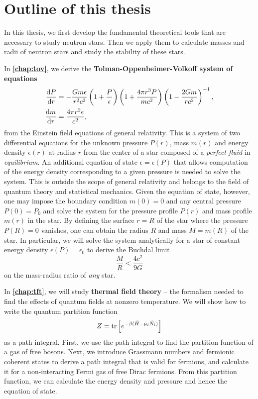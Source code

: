 \section{Outline of this thesis}

In this thesis, we first develop the fundamental theoretical tools that are necessary to study neutron stars.
Then we apply them to calculate masses and radii of neutron stars and study the stability of these stars.

In \textbf{\cref{chap:tov}}, we derive the \textbf{Tolman-Oppenheimer-Volkoff system of equations}
\begin{align*}
	\odv{P}{r} &= -\frac{G m \epsilon}{r^2 c^2} \left( 1 + \frac{P}{\epsilon} \right) \left( 1 + \frac{4 \pi r^3 P}{m c^2} \right) \left( 1 - \frac{2 G m}{r c^2} \right)^{-1} , \\
	\odv{m}{r} &= \frac{4 \pi r^2 \epsilon}{c^2} ,
\end{align*}
from the Einstein field equations of general relativity.
This is a system of two differential equations for the unknown pressure $P(r)$, mass $m(r)$ and energy density $\epsilon(r)$ at radius $r$ from the center of a star composed of a \emph{perfect fluid} in \emph{equilibrium}.
An additional equation of state $\epsilon = \epsilon(P)$ that allows computation of the energy density corresponding to a given pressure is needed to solve the system.
This is outside the scope of general relativity and belongs to the field of quantum theory and statistical mechanics.
Given the equation of state, however, one may impose the boundary condition $m(0) = 0$ and any central pressure $P(0) = P_0$ and solve the system for the pressure profile $P(r)$ and mass profile $m(r)$ in the star.
By defining the surface $r=R$ of the star where the pressure $P(R) = 0$ vanishes, one can obtain the radius $R$ and mass $M = m(R)$ of the star.
In particular, we will solve the system analytically for a star of constant energy density $\epsilon(P) = \epsilon_0$ to derive the Buchdal limit
\begin{equation*}
	\frac{M}{R} < \frac{4 c^2}{9 G}
\end{equation*}
on the mass-radius ratio of \emph{any} star.

In \textbf{\cref{chap:tft}}, we will study \textbf{thermal field theory} -- the formalism needed to find the effects of quantum fields at nonzero temperature.
We will show how to write the quantum partition function
\begin{equation*}
	Z = \text{tr} \left[ e^{-\beta(\hat{H} - \mu_i \hat{N}_i)} \right]
\end{equation*}
as a path integral.
First, we use the path integral to find the partition function of a gas of free bosons.
Next, we introduce Grassmann numbers and fermionic coherent states to derive a path integral that is valid for fermions, and calculate it for a non-interacting Fermi gas of free Dirac fermions.
From this partition function, we can calculate the energy density and pressure and hence the equation of state.

